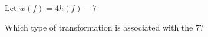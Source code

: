 \documentclass{ximera}
\begin{document}
\begin{exercise}
\begin{question}


Let $w(f) = 4 h(f) - 7$


Which type of transformation is associated with the $7$?


\begin{multipleChoice}
\end{multipleChoice}


\end{question}










\end{exercise}
\end{document}
